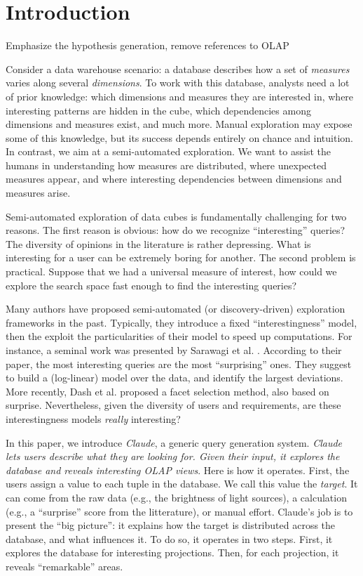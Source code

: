 \section{Introduction}
\label{sec:intro}

{ \color{red}
    Emphasize the hypothesis generation, remove references to OLAP}

Consider a data warehouse scenario: a database describes how a set of
\emph{measures} varies along several \emph{dimensions}. To work with this
database, analysts need a lot of prior knowledge: which dimensions and measures
they are interested in, where interesting patterns are hidden in the cube,
which dependencies among dimensions and measures exist, and much more.  Manual
exploration may expose some of this knowledge, but its success depends entirely
on chance and intuition. In contrast, we aim at a semi-automated exploration.
We want to assist the humans in understanding how measures are distributed,
where unexpected measures appear, and where interesting dependencies between
dimensions and measures arise.

Semi-automated exploration of data cubes is fundamentally challenging for two
reasons. The first reason is obvious: how do we recognize ``interesting''
queries?  The diversity of opinions in the literature is rather depressing.
What is interesting for a user can be extremely boring for another. The second
problem is practical.  Suppose that we had a universal measure of interest, how
could we explore the search space fast enough to find the interesting queries?

Many authors have proposed semi-automated (or discovery-driven) exploration
frameworks in the past. Typically, they introduce a fixed ``interestingness''
model, then the exploit the particularities of their model to speed up
computations.  For instance, a seminal work was presented by Sarawagi et al.
\cite{sarawagi1998discovery}. According to their paper, the most interesting
queries are the most ``surprising'' ones.  They suggest to build a (log-linear)
model over the data, and identify the largest deviations. More recently, Dash
et al.\cite{dash2008dynamic} proposed a facet selection method, also based on
surprise. Nevertheless, given the diversity of users and requirements, are
these interestingness models \emph{really} interesting?

In this paper, we introduce \textit{Claude}, a generic query generation
system. \emph{Claude lets users describe what they are looking for.
Given their input, it explores the database and reveals interesting OLAP views}.
Here is how it operates. First, the users assign a value to each tuple in
the database.  We call this value the \emph{target}. It can come from the raw
data (e.g., the brightness of light sources), a calculation (e.g., a
``surprise'' score from the litterature), or manual effort. Claude's job is to
present the ``big picture'': it explains how the target is distributed across
the database, and what influences it. To do so, it operates in two steps.
First, it explores the database for interesting projections. Then, for each
projection, it reveals ``remarkable'' areas. 

